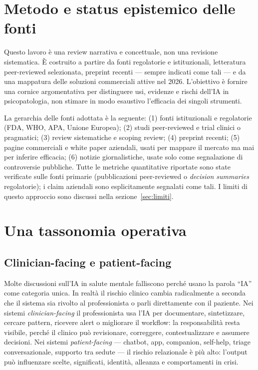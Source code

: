 \documentclass[11pt,a4paper]{article}
\begin{document}
\section{Metodo e status epistemico delle fonti}
\label{sec:metodo}

Questo lavoro è una review narrativa e concettuale, non una revisione sistematica. È costruito a partire da fonti regolatorie e istituzionali, letteratura peer-reviewed selezionata, preprint recenti --- sempre indicati come tali --- e da una mappatura delle soluzioni commerciali attive nel 2026. L'obiettivo è fornire una cornice argomentativa per distinguere usi, evidenze e rischi dell'IA in psicopatologia, non stimare in modo esaustivo l'efficacia dei singoli strumenti.

La gerarchia delle fonti adottata è la seguente: (1) fonti istituzionali e regolatorie (FDA, WHO, APA, Unione Europea); (2) studi peer-reviewed e trial clinici o pragmatici; (3) review sistematiche e scoping review; (4) preprint recenti; (5) pagine commerciali e white paper aziendali, usati per mappare il mercato ma mai per inferire efficacia; (6) notizie giornalistiche, usate solo come segnalazione di controversie pubbliche. Tutte le metriche quantitative riportate sono state verificate sulle fonti primarie (pubblicazioni peer-reviewed o \emph{decision summaries} regolatorie); i claim aziendali sono esplicitamente segnalati come tali. I limiti di questo approccio sono discussi nella sezione~\ref{sec:limiti}.

\section{Una tassonomia operativa}
\label{sec:tassonomia}

\subsection{Clinician-facing e patient-facing}

Molte discussioni sull'IA in salute mentale falliscono perché usano la parola ``IA'' come categoria unica. In realtà il rischio clinico cambia radicalmente a seconda che il sistema sia rivolto al professionista o parli direttamente con il paziente. Nei sistemi \emph{clinician-facing} il professionista usa l'IA per documentare, sintetizzare, cercare pattern, ricevere alert o migliorare il workflow: la responsabilità resta visibile, perché il clinico può revisionare, correggere, contestualizzare e assumere decisioni. Nei sistemi \emph{patient-facing} --- chatbot, app, companion, self-help, triage conversazionale, supporto tra sedute --- il rischio relazionale è più alto: l'output può influenzare scelte, significati, identità, alleanza e comportamenti in crisi.
\end{document}
